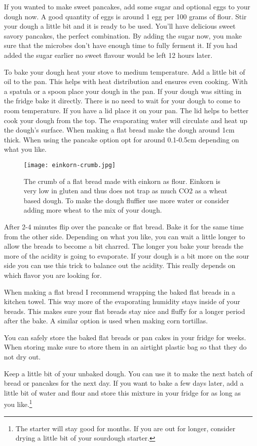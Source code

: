 If you wanted to make sweet pancakes, add some sugar and optional eggs to your dough
now. A good quantity of eggs is around 1 egg per 100 grams of flour.
Stir your dough a little bit and it is ready to be used. You'll 
have delicious sweet savory pancakes, the perfect combination. By
adding the sugar now, you make sure that the microbes don't have
enough time to fully ferment it. If you had added the sugar
earlier no sweet flavour would be left 12 hours later.

To bake your dough heat your stove to medium temperature. Add a little bit of
oil to the pan. This helps with heat distribution and ensures even cooking.
With a spatula or a spoon place your dough in the pan. If your dough
was sitting in the fridge bake it directly. There is no need to wait for your
dough to come to room temperature. If you have a lid
place it on your pan. The lid helps to better cook your dough from the top.
The evaporating water will circulate and heat up the dough's surface. When
making a flat bread make the dough around 1cm thick. When using the pancake
option opt for around 0.1-0.5cm depending on what you like.

\begin{figure}[htb!]
  \texttt{[image: einkorn-crumb.jpg]}
  \centering
  \caption{The crumb of a flat bread made with einkorn as flour. Einkorn
  is very low in gluten and thus does not trap as much CO2 as a wheat based
  dough. To make the dough fluffier use more water or consider adding
  more wheat to the mix of your dough.}
\end{figure}

After 2-4 minutes flip over the pancake or flat bread. Bake it for the same
time from the other side. Depending on what you like, you can wait a little
longer to allow the breads to become a bit charred.  The longer you
bake your breads the more of the acidity is going to evaporate. If your
dough is a bit more on the sour side you can use this trick to balance
out the acidity. This really depends on which flavor you are looking for.

When making a flat bread I recommend wrapping the baked flat breads
in a kitchen towel. This way more of the evaporating humidity
stays inside of your breads. This makes sure your flat breads stay
nice and fluffy for a longer period after the bake. A similar option is
used when making corn tortillas.

You can safely store the baked flat breads or pan cakes in your fridge
for weeks. When storing make sure to store them in an airtight plastic bag so that
they do not dry out.

Keep a little bit of your unbaked dough. You can use it to make the next
batch of bread or pancakes for the next day. If you want to bake a few days later, add
a little bit of water and flour and store this mixture in your fridge
for as long as you like.\footnote{The starter will stay good for months. If you are out
for longer, consider drying a little bit of your sourdough starter.}

